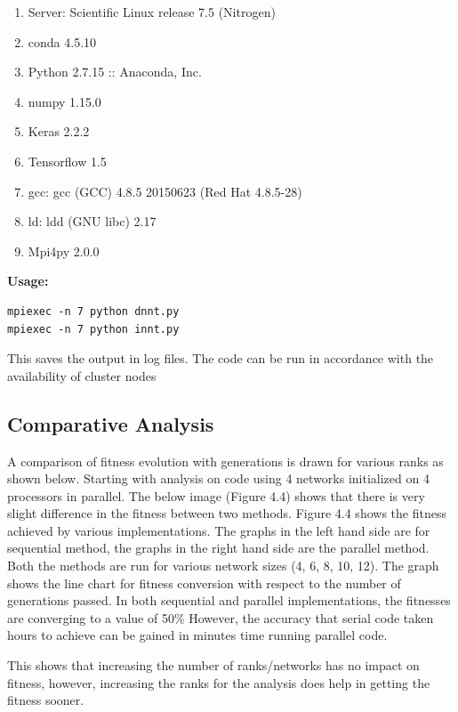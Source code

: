 \begin{enumerate}
	\def\labelenumi{\arabic{enumi}.}
	\item
	Server: Scientific Linux release 7.5 (Nitrogen)
	\item
	conda 4.5.10
	\item
	Python 2.7.15 :: Anaconda, Inc.
	\item
	numpy 1.15.0
	\item
	Keras 2.2.2
	\item
	Tensorflow 1.5
	\item
	gcc: gcc (GCC) 4.8.5 20150623 (Red Hat 4.8.5-28)
	\item
	ld: ldd (GNU libc) 2.17
	\item
	Mpi4py 2.0.0
\end{enumerate}

\textbf{Usage:}

\begin{verbatim}
mpiexec -n 7 python dnnt.py
mpiexec -n 7 python innt.py
\end{verbatim}

This saves the output in log files. The code can be run in accordance with the availability of cluster nodes



\subsection{Comparative Analysis}


A comparison of fitness evolution with generations is drawn for various ranks as shown below.
Starting with analysis on code using 4 networks initialized on 4
processors in parallel. The below image (Figure 4.4) shows that there is very slight difference in the fitness between two methods.
Figure 4.4 shows the fitness achieved by various implementations.
The graphs in the left hand side are for sequential method, the graphs in the right hand side are the parallel method. Both the methods are run for various network sizes (4, 6, 8, 10, 12). The graph shows the line chart for fitness conversion with respect to the number of generations passed. In both sequential and parallel implementations, the fitnesses are converging to a value of 50\%
However, the accuracy that serial code taken hours to achieve can be gained in minutes time running parallel code.



This shows that increasing the number of ranks/networks has no impact on
fitness, however, increasing the ranks for the analysis does help in
getting the fitness sooner.


